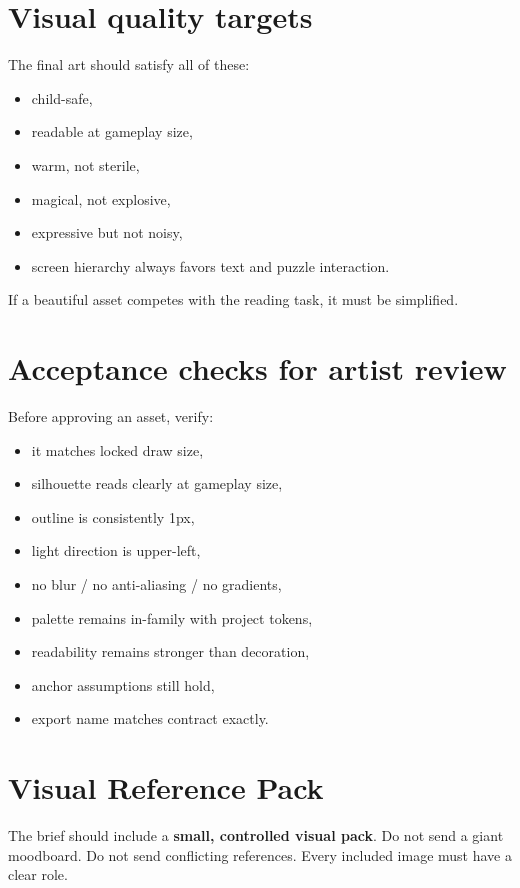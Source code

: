 \documentclass[11pt,a4paper]{article}
\begin{document}
\section{Visual quality targets}

The final art should satisfy all of these:
\begin{itemize}
  \item child-safe,
  \item readable at gameplay size,
  \item warm, not sterile,
  \item magical, not explosive,
  \item expressive but not noisy,
  \item screen hierarchy always favors text and puzzle interaction.
\end{itemize}

If a beautiful asset competes with the reading task, it must be simplified.

\section{Acceptance checks for artist review}

Before approving an asset, verify:
\begin{itemize}
  \item it matches locked draw size,
  \item silhouette reads clearly at gameplay size,
  \item outline is consistently 1px,
  \item light direction is upper-left,
  \item no blur / no anti-aliasing / no gradients,
  \item palette remains in-family with project tokens,
  \item readability remains stronger than decoration,
  \item anchor assumptions still hold,
  \item export name matches contract exactly.
\end{itemize}

\section{Visual Reference Pack}

The brief should include a \textbf{small, controlled visual pack}. Do not send a giant moodboard. Do not send conflicting references. Every included image must have a clear role.
\end{document}

